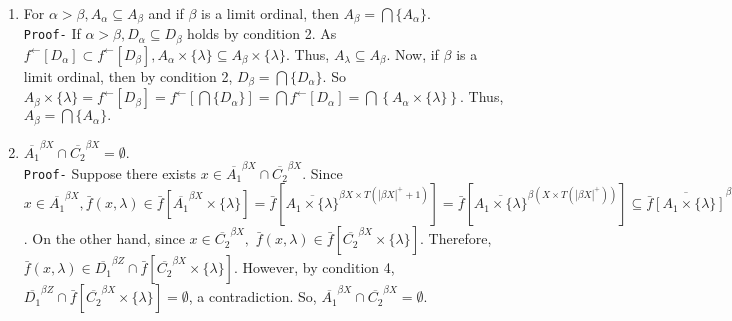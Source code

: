 \documentclass{article}
\begin{document}
\begin{enumerate}
																																					      \vskip 20pt	

																																					      \item For $\alpha>\beta, A_\alpha \subseteq A_\beta$ and if $\beta$ is a limit ordinal, then $A_\beta=\bigcap\{A_\alpha\}.$\\
																																																		    \texttt{Proof-} If $\alpha>\beta, D_\alpha\subseteq D_\beta$ holds by condition 2. As $f^{\leftarrow}\left[D_\alpha\right]\subset f^{\leftarrow}\left[D_\beta\right], A_\alpha\times \{\lambda\} \subseteq A_\beta\times \{\lambda\}$. Thus, $A_\lambda \subseteq A_\beta.$ Now, if $\beta$ is a limit ordinal, then by condition 2, $D_\beta=\bigcap \{D_\alpha\}.$ So $A_\beta\times\{\lambda\}=f^{\leftarrow}\left[D_\beta\right]=f^{\leftarrow}\left[\bigcap\{D_\alpha\}\right]=\bigcap f^{\leftarrow}\left[D_\alpha\right]=\bigcap \left\{A_\alpha\times \{\lambda\}\right\}.$ Thus, $A_\beta=\bigcap \{A_\alpha\}.$



																																																		    \vskip 20pt


																																																		    \item $\overline{A_1}^{\beta X} \cap \overline{C_2}^{\beta X}=\emptyset.$ \\
																																																			\texttt{Proof-} Suppose there exists $x\in \overline{A_1}^{\beta X}\cap \overline{C_2}^{\beta X}.$ Since $x\in \overline{A_1}^{\beta X}, \bar{f}(x,\lambda)\in \bar{f}\left[\overline{A_1}^{\beta X}\times \{\lambda\}\right] = \bar{f}\left[\overline{A_1 \times \{\lambda\}}^{\beta X\times T(|\beta X|^+ +1)}\right]=\bar{f}\left[\overline{A_1 \times \{\lambda\}}^{\beta (X\times T(|\beta X|^+ ))}\right]\subseteq \overline{\bar{f}\left[A_1\times\{\lambda\}\right]}^{\beta Z}=\overline{f\left[A_1\times\{\lambda\}\right]}^{\beta Z}=\overline{D_1}^{\beta Z}$. On the other hand, since $x\in \overline{C_2}^{\beta X},$ $\bar{f}(x,\lambda)\in \bar{f}\left[\overline{C_2}^{\beta X}\times \{\lambda\}\right].$ Therefore, $\bar{f}(x,\lambda)\in \overline{D_1}^{\beta Z} \cap \bar{f}\left[\overline{C_2}^{\beta X}\times \{\lambda\}\right].$ However, by condition 4,  $\overline{D_1}^{\beta Z} \cap \bar{f}\left[\overline{C_2}^{\beta X}\times \{\lambda\}\right]=\emptyset$, a contradiction. So, $\overline{A_1}^{\beta X} \cap \overline{C_2}^{\beta X}=\emptyset.$


																																																			\vskip 20pt


\end{enumerate}
\end{document}
